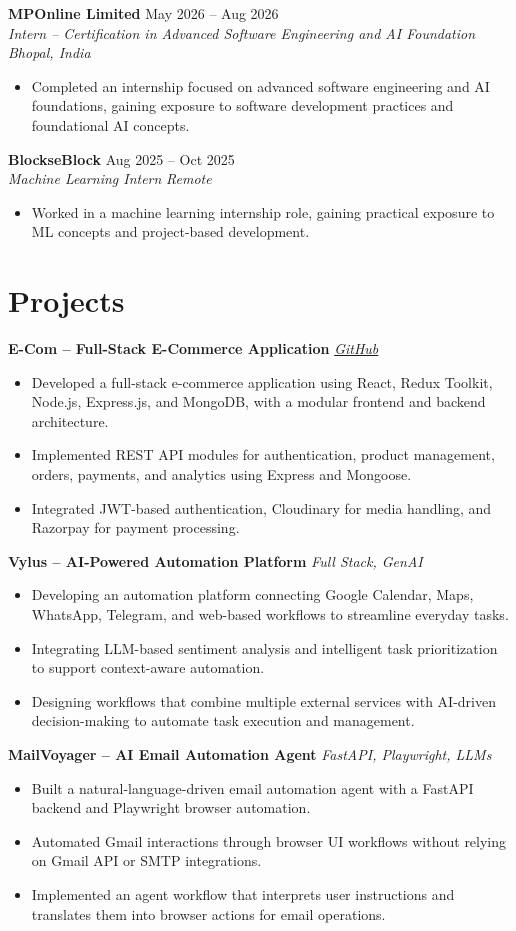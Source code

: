 \documentclass[10pt,a4paper]{article}
\newcommand{\resumeItem}[1]{
  \item\small{#1}
}
\newcommand{\resumeSubheading}[4]{
  \textbf{#1} \hfill \small #2\\
  \textit{\small #3} \hfill \textit{\small #4}
}
\newcommand{\projectHeading}[2]{
  \textbf{#1} \hfill \textit{\small #2}
}
\begin{document}
\resumeSubheading
{MPOnline Limited}{May 2026 -- Aug 2026}
{Intern -- Certification in Advanced Software Engineering and AI Foundation}
{Bhopal, India}
\begin{itemize}
    \resumeItem{Completed an internship focused on advanced software engineering and AI foundations, gaining exposure to software development practices and foundational AI concepts.}
\end{itemize}

\resumeSubheading
{BlockseBlock}{Aug 2025 -- Oct 2025}
{Machine Learning Intern}
{Remote}
\begin{itemize}
    \resumeItem{Worked in a machine learning internship role, gaining practical exposure to ML concepts and project-based development.}
\end{itemize}

\section{Projects}

\projectHeading{E-Com -- Full-Stack E-Commerce Application}
{\href{https://github.com/Auth0r-C0dez/E-Com}{GitHub}}
\begin{itemize}
    \resumeItem{Developed a full-stack e-commerce application using React, Redux Toolkit, Node.js, Express.js, and MongoDB, with a modular frontend and backend architecture.}
    \resumeItem{Implemented REST API modules for authentication, product management, orders, payments, and analytics using Express and Mongoose.}
    \resumeItem{Integrated JWT-based authentication, Cloudinary for media handling, and Razorpay for payment processing.}
\end{itemize}

\projectHeading{Vylus -- AI-Powered Automation Platform}
{Full Stack, GenAI}
\begin{itemize}
    \resumeItem{Developing an automation platform connecting Google Calendar, Maps, WhatsApp, Telegram, and web-based workflows to streamline everyday tasks.}
    \resumeItem{Integrating LLM-based sentiment analysis and intelligent task prioritization to support context-aware automation.}
    \resumeItem{Designing workflows that combine multiple external services with AI-driven decision-making to automate task execution and management.}
\end{itemize}

\projectHeading{MailVoyager -- AI Email Automation Agent}
{FastAPI, Playwright, LLMs}
\begin{itemize}
    \resumeItem{Built a natural-language-driven email automation agent with a FastAPI backend and Playwright browser automation.}
    \resumeItem{Automated Gmail interactions through browser UI workflows without relying on Gmail API or SMTP integrations.}
    \resumeItem{Implemented an agent workflow that interprets user instructions and translates them into browser actions for email operations.}
\end{itemize}
\end{document}

